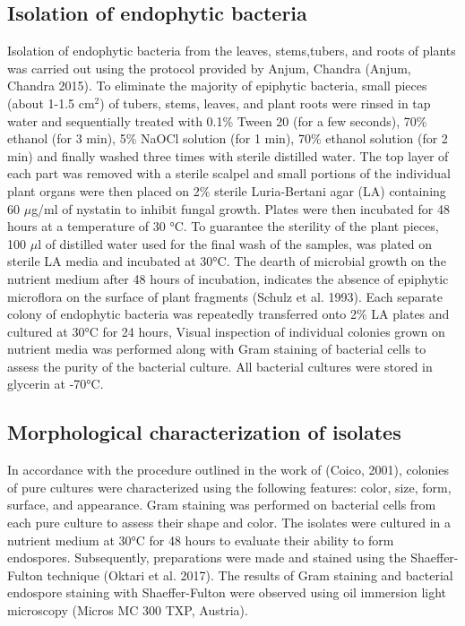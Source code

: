 \documentclass[sn-mathphys,Numbered]{sn-jnl}%
\theoremstyle{thmstyleone}%
\theoremstyle{thmstyletwo}%
\theoremstyle{thmstylethree}%
\begin{document}
\subsection*{Isolation of endophytic bacteria}
Isolation of endophytic bacteria from the leaves, stems,tubers, and roots of plants was carried out using the protocol provided by Anjum, Chandra (Anjum, Chandra 2015). To eliminate the majority of epiphytic bacteria, small pieces (about 1-1.5 cm$^2$)  of tubers, stems, leaves, and plant roots  were rinsed in tap water and sequentially treated with 0.1\% Tween 20 (for a few seconds), 70\% ethanol (for 3 min), 5\% NaOCl solution (for 1 min), 70\% ethanol solution (for 2 min) and finally washed three times with sterile distilled water. The top layer of each part was removed with a sterile scalpel and small portions of the individual plant organs were then placed on 2\% sterile Luria-Bertani agar (LA) containing 60 $\mu$g/ml of nystatin to inhibit fungal growth.
Plates were then incubated for 48 hours at a temperature of 30 °C. To guarantee the sterility of the plant pieces, 100 $\mu$l of distilled water used for the final wash of the samples, was plated on sterile LA media and incubated at 30°C. The dearth of microbial growth on the nutrient medium after 48 hours of incubation, indicates the absence of epiphytic microflora on the surface of plant fragments (Schulz et al. 1993). Each separate colony of endophytic bacteria was repeatedly transferred onto 2\% LA plates and cultured at 30°C for 24 hours, Visual inspection of individual colonies grown on nutrient media was performed along with Gram staining of bacterial cells to assess the purity of the bacterial culture. All bacterial cultures were stored in glycerin at -70°C.








\subsection*{Morphological characterization of isolates}
In accordance with the procedure outlined in the work of (Coico, 2001), colonies of pure cultures were characterized using the following features: color, size, form, surface, and appearance. Gram staining was performed on bacterial cells from each pure culture to assess their shape and color. The isolates were cultured in a nutrient medium at 30°C for 48 hours to evaluate their ability to form endospores. Subsequently, preparations were made and stained using the Shaeffer-Fulton technique (Oktari et al. 2017). The results of Gram staining and bacterial endospore staining with Shaeffer-Fulton were observed using oil immersion light microscopy (Micros MC 300 TXP, Austria).
\end{document}
